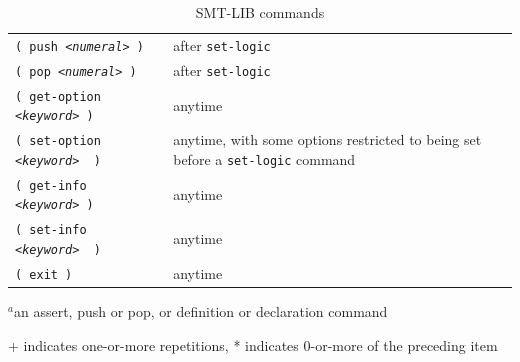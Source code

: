\documentclass[12pt,oneside]{report}
\newcommand{\keyword}{{\it <keyword>}}
\newcommand{\attrvalue}{{\it <attr-value>}}
\newcommand{\numeral}{{\it <numeral>}}
\begin{document}
\begin{table}
\begin{center}
\begin{tabular}{|p{3.07in}|p{2.5in}|}
{\tt ( push \numeral\ )} & after {\tt set-logic} \\
{\tt ( pop \numeral\ )} &  after {\tt set-logic} \\
{\tt ( get-option \keyword\ )} &  anytime \\
{\tt ( set-option \keyword\ \attrvalue\ )}   & anytime, with some options restricted to being set before a {\tt set-logic} command\\
{\tt ( get-info \keyword\ )}   & anytime\\
{\tt ( set-info \keyword\ \attrvalue\ )}   & anytime\\
{\tt ( exit )}   & anytime\\

\hline
\end{tabular}
\end{center}
\caption{SMT-LIB commands}
\begin{tablenotes}
\vspace{6pt}
\item[] $^a$an assert, push or pop, or definition or declaration command
\item[] + indicates one-or-more repetitions, * indicates 0-or-more of the preceding item
\end{tablenotes}
\label{Tab:Commands}
\end{table}
\end{document}
